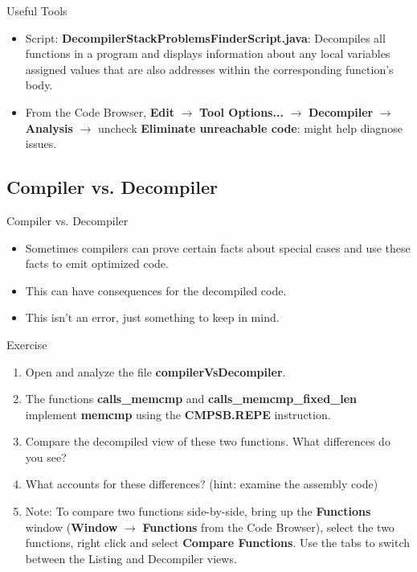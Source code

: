 \documentclass{beamer}
\begin{document}
\begin{frame}
\begin{block}{Useful Tools}
\begin{itemize}
\item Script: \textbf{DecompilerStackProblemsFinderScript.java}: Decompiles all functions in a program and displays information about any local variables assigned
values that are also addresses within the corresponding function's body.
\item From the Code Browser, \textbf{Edit} $\rightarrow$ \textbf{Tool Options...} $\rightarrow$ \textbf{Decompiler} $\rightarrow$ \textbf{Analysis} 
$\rightarrow$ uncheck \textbf{Eliminate unreachable code}: might help diagnose issues.
\end{itemize}
\end{block}
\end{frame}


\subsection{Compiler vs. Decompiler}
\begin{frame}
\begin{block}{Compiler vs. Decompiler}
\begin{itemize}
\item Sometimes compilers can prove certain facts about special cases and use these facts to emit optimized code.
\item This can have consequences for the decompiled code.
\item This isn't an error, just something to keep in mind. 
\end{itemize}
\end{block}
\end{frame}

\begin{frame}
\begin{block}{Exercise}
\begin{enumerate}
\item Open and analyze the file \textbf{compilerVsDecompiler}.
\item The functions \textbf{calls\_memcmp} and \textbf{calls\_memcmp\_fixed\_len} implement \textbf{memcmp} using the \textbf{CMPSB.REPE} instruction.
\item Compare the decompiled view of these two functions.  What differences do you see?
\item What accounts for these differences? (hint: examine the assembly code)
\item Note: To compare two functions side-by-side, bring up the \textbf{Functions} window (\textbf{Window} $\rightarrow$ \textbf{Functions} from the Code Browser), select
the two functions, right click and select \textbf{Compare Functions}.  Use the tabs to switch between the Listing and Decompiler views.
\end{enumerate}
\end{block}
\end{frame}
\end{document}
